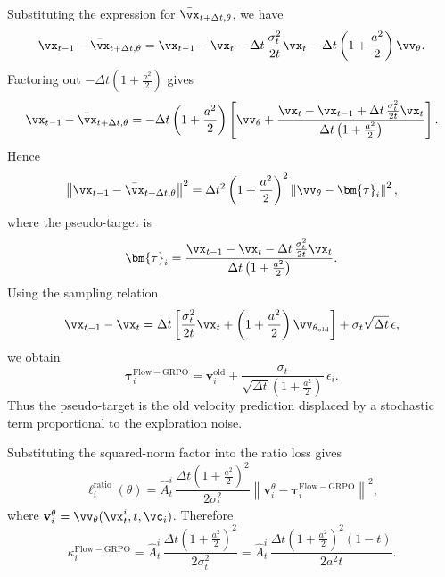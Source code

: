 \documentclass{article} %
\begin{document}
Substituting the expression for \(\bar{\vx}_{t+\Delta t,\theta}\), we have
\begin{equation}
\vx_{t-1}-\bar{\vx}_{t+\Delta t,\theta}
=
\vx_{t-1}-\vx_t
-\Delta t\,\frac{\sigma_t^2}{2t}\vx_t
-\Delta t\left(1+\frac{a^2}{2}\right)\vv_\theta .
\end{equation}
Factoring out \(-\Delta t\left(1+\frac{a^2}{2}\right)\) gives
\begin{equation}
\vx_{t-1}-\bar{\vx}_{t+\Delta t,\theta}
=
-\Delta t\left(1+\frac{a^2}{2}\right)
\left[
\vv_\theta
+
\frac{\vx_t-\vx_{t-1}
+\Delta t\,\frac{\sigma_t^2}{2t}\vx_t}
{\Delta t\left(1+\frac{a^2}{2}\right)}
\right].
\end{equation}
Hence
\begin{equation}
\left\|\vx_{t-1}-\bar{\vx}_{t+\Delta t,\theta}\right\|^2
=
\Delta t^2\left(1+\frac{a^2}{2}\right)^2
\left\|
\vv_\theta
-
\bm{\tau}_i
\right\|^2,
\end{equation}
where the pseudo-target is
\begin{equation}
\bm{\tau}_i
=
\frac{\vx_{t-1}-\vx_t
-\Delta t\,\frac{\sigma_t^2}{2t}\vx_t}
{\Delta t\left(1+\frac{a^2}{2}\right)}.
\end{equation}
Using the sampling relation
\begin{equation}
\vx_{t-1}-\vx_t
=
\Delta t\left[
\frac{\sigma_t^2}{2t}\vx_t
+
\left(1+\frac{a^2}{2}\right)\vv_{\theta_{\mathrm{old}}}
\right]
+
\sigma_t\sqrt{\Delta t}\,\epsilon,
\end{equation}
we obtain
\begin{equation}
\label{eq:flowgrpo_pseudo_target}
\bm{\tau}_i^{\mathrm{Flow-GRPO}}
=
\mathbf{v}_i^{\mathrm{old}}
+
\frac{\sigma_t}
{\sqrt{\Delta t}\left(1+\frac{a^2}{2}\right)}\,\epsilon_i .
\end{equation}
Thus the pseudo-target is the old velocity prediction displaced by a
stochastic term proportional to the exploration noise.

Substituting the squared-norm factor into the ratio loss gives
\begin{equation}
\ell_i^{\mathrm{ratio}}(\theta)
=
\hat{A}^i_t\,
\frac{\Delta t\left(1+\frac{a^2}{2}\right)^2}{2\sigma_t^2}
\left\|
\mathbf{v}_i^\theta-\bm{\tau}_i^{\mathrm{Flow-GRPO}}
\right\|^2,
\end{equation}
where \(\mathbf{v}_i^\theta=\vv_\theta(\vx^i_t,t,\vc_i)\). Therefore
\begin{equation}
\label{eq:flowgrpo_weight}
\kappa_i^{\mathrm{Flow-GRPO}}
=
\hat{A}^i_t\,
\frac{\Delta t\left(1+\frac{a^2}{2}\right)^2}{2\sigma_t^2}
=
\hat{A}^i_t\,
\frac{\Delta t\left(1+\frac{a^2}{2}\right)^2(1-t)}{2a^2 t}.
\end{equation}
\end{document}
